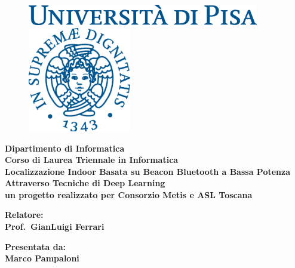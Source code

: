 \documentclass[12pt]{report}
\begin{document}
\begin{titlepage}
  \begin{figure}[t]
    \centering\includegraphics[width=0.9\textwidth]{./img/logo.eps}
    
    \vspace{1cm}
    
    \centering\includegraphics[width=0.4\textwidth]{./img/cherubino.eps}
  \end{figure}

  \begin{center}
    \textbf{ Dipartimento di Informatica\\ Corso di Laurea Triennale in Informatica\\}
    \vspace{15mm}
    {\LARGE{\bf Localizzazione Indoor Basata su Beacon Bluetooth a Bassa Potenza
    Attraverso Tecniche di Deep Learning}}\\
    {\large{\bf un progetto realizzato per Consorzio Metis e ASL Toscana}} \\
  \end{center}

  \vspace{20mm}

  \begin{minipage}[t]{0.47\textwidth}
    {\large{\bf Relatore:\\ Prof.\ GianLuigi Ferrari 
    }}
  \end{minipage}\hfill
  \begin{minipage}[t]{0.47\textwidth}\raggedleft
    {\large{\bf Presentata da: \\ Marco Pampaloni}}
  \end{minipage}

  \vfill



\end{titlepage}
\end{document}
